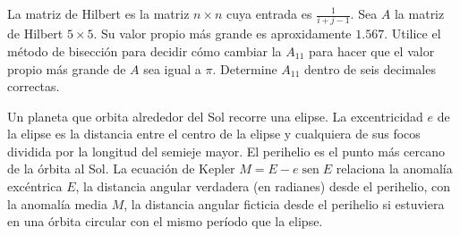 \begin{questions}
    La matriz de Hilbert es la matriz $n\times n$ cuya entrada es
    \begin{math}
        \frac{1}{i+j-1}
    \end{math}.
    Sea $A$ la matriz de Hilbert $5\times 5$.
    Su valor propio más grande es aproxidamente $1.567$.
    Utilice el método de bisección para decidir cómo cambiar la
    $A_{11}$ para hacer que el valor propio más grande de $A$ sea
    igual a $\pi$.
    Determine $A_{11}$ dentro de seis decimales correctas.

    \question

    Un planeta que orbita alrededor del Sol recorre una elipse.
    La excentricidad $e$ de la elipse es la distancia entre el centro
    de la elipse y cualquiera de sus focos dividida por la longitud
    del semieje mayor.
    El perihelio es el punto más cercano de la órbita al Sol.
    La ecuación de Kepler $M=E-e\operatorname{sen}E$ relaciona la
    anomalía excéntrica $E$, la distancia angular verdadera (en
    radianes) desde el perihelio, con la anomalía media $M$, la
    distancia angular ficticia desde el perihelio si estuviera en una
    órbita circular con el mismo período que la elipse.


    \question


\end{questions}
